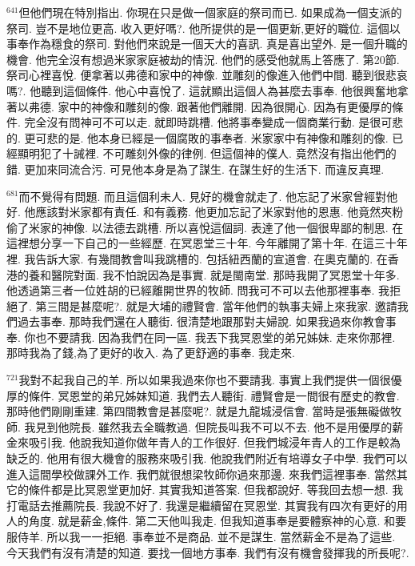 \documentclass{book}
\begin{document}
$^{641}$但他們現在特別指出.
你現在只是做一個家庭的祭司而已.
如果成為一個支派的祭司.
豈不是地位更高.
收入更好嗎?.
他所提供的是一個更新,更好的職位.
這個以事奉作為穩食的祭司.
對他們來說是一個天大的喜訊.
真是喜出望外.
是一個升職的機會.
他完全沒有想過米家家庭被劫的情況.
他們的感受他就馬上答應了.
第20節.
祭司心裡喜悅.
便拿著以弗德和家中的神像.
並雕刻的像進入他們中間.
聽到很悲哀嗎?.
他聽到這個條件.
他心中喜悅了.
這就顯出這個人為甚麼去事奉.
他很興奮地拿著以弗德.
家中的神像和雕刻的像.
跟著他們離開.
因為很開心.
因為有更優厚的條件.
完全沒有問神可不可以走.
就即時跳槽.
他將事奉變成一個商業行動.
是很可悲的.
更可悲的是.
他本身已經是一個腐敗的事奉者.
米家家中有神像和雕刻的像.
已經顯明犯了十誡裡.
不可雕刻外像的律例.
但這個神的僕人.
竟然沒有指出他們的錯.
更加來同流合污.
可見他本身是為了謀生.
在謀生好的生活下.
而違反真理.

$^{681}$而不覺得有問題.
而且這個利未人.
見好的機會就走了.
他忘記了米家曾經對他好.
他應該對米家都有責任.
和有義務.
他更加忘記了米家對他的恩惠.
他竟然夾粉偷了米家的神像.
以法德去跳槽.
所以喜悅這個詞.
表達了他一個很卑鄙的制思.
在這裡想分享一下自己的一些經歷.
在冥恩堂三十年.
今年離開了第十年.
在這三十年裡.
我告訴大家.
有幾間教會叫我跳槽的.
包括紐西蘭的宣道會.
在奧克蘭的.
在香港的養和醫院對面.
我不怕說因為是事實.
就是閩南堂.
那時我開了冥恩堂十年多.
他透過第三者一位姓胡的已經離開世界的牧師.
問我可不可以去他那裡事奉.
我拒絕了.
第三間是甚麼呢?.
就是大埔的禮賢會.
當年他們的執事夫婦上來我家.
邀請我們過去事奉.
那時我們還在人聽街.
很清楚地跟那對夫婦說.
如果我過來你教會事奉.
你也不要請我.
因為我們在同一區.
我丟下我冥恩堂的弟兄姊妹.
走來你那裡.
那時我為了錢,為了更好的收入.
為了更舒適的事奉.
我走來.

$^{721}$我對不起我自己的羊.
所以如果我過來你也不要請我.
事實上我們提供一個很優厚的條件.
冥恩堂的弟兄姊妹知道.
我們去人聽街.
禮賢會是一間很有歷史的教會.
那時他們剛剛重建.
第四間教會是甚麼呢?.
就是九龍城浸信會.
當時是張無礙做牧師.
我見到他院長.
雖然我去全職教過.
但院長叫我不可以不去.
他不是用優厚的薪金來吸引我.
他說我知道你做年青人的工作很好.
但我們城浸年青人的工作是較為缺乏的.
他用有很大機會的服務來吸引我.
他說我們附近有培導女子中學.
我們可以進入這間學校做課外工作.
我們就很想梁牧師你過來那邊.
來我們這裡事奉.
當然其它的條件都是比冥恩堂更加好.
其實我知道答案.
但我都說好.
等我回去想一想.
我打電話去推薦院長.
我說不好了.
我還是繼續留在冥恩堂.
其實我有四次有更好的用人的角度.
就是薪金,條件.
第二天他叫我走.
但我知道事奉是要體察神的心意.
和要服侍羊.
所以我一一拒絕.
事奉並不是商品.
並不是謀生.
當然薪金不是為了這些.
今天我們有沒有清楚的知道.
要找一個地方事奉.
我們有沒有機會發揮我的所長呢?.
\end{document}
